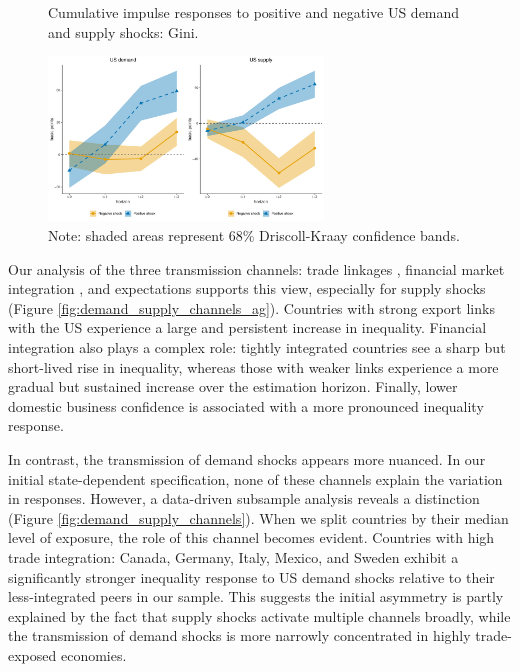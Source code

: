 \documentclass[12pt, a4paper]{article}
\begin{document}
\begin{figure}[H]
    \centering
    \caption{Cumulative impulse responses to positive and negative US demand and supply shocks: Gini.}
    \label{fig:demand_supply_asym}
    \includegraphics[width=0.65\textwidth]{Figures/asymmetric_IRFs.pdf}
    \centering \caption*{Note: shaded areas represent 68\% Driscoll-Kraay confidence bands.}
\end{figure}

Our analysis of the three transmission channels: trade linkages \parencite{corsetti2011multilateral}, financial market integration \parencite{faccini2016international}, and expectations \parencite{klein2021real} supports this view, especially for supply shocks (Figure \ref{fig:demand_supply_channels_ag}). Countries with strong export links with the US experience a large and persistent increase in inequality. Financial integration also plays a complex role: tightly integrated countries see a sharp but short-lived rise in inequality, whereas those with weaker links experience a more gradual but sustained increase over the estimation horizon. Finally, lower domestic business confidence is associated with a more pronounced inequality response.

In contrast, the transmission of demand shocks appears more nuanced. In our initial state-dependent specification, none of these channels explain the variation in responses. However, a data-driven subsample analysis reveals a distinction (Figure \ref{fig:demand_supply_channels}). When we split countries by their median level of exposure, the role of this channel becomes evident. Countries with high trade integration: Canada, Germany, Italy, Mexico, and Sweden exhibit a significantly stronger inequality response to US demand shocks relative to their less-integrated peers in our sample. This suggests the initial asymmetry is partly explained by the fact that supply shocks activate multiple channels broadly, while the transmission of demand shocks is more narrowly concentrated in highly trade-exposed economies.
\end{document}
